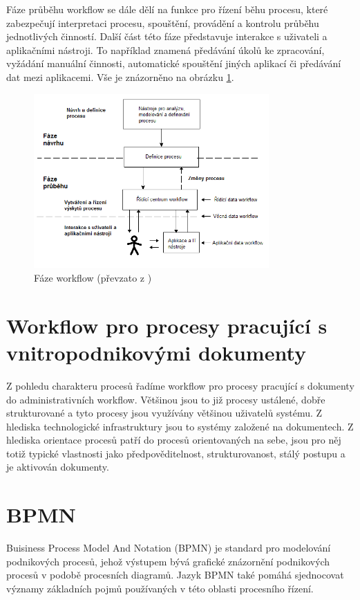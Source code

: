 \documentclass{fithesis}
\begin{document}
Fáze průběhu workflow se dále dělí na funkce pro řízení běhu procesu, které zabezpečují interpretaci procesu, spouštění, provádění a kontrolu průběhu jednotlivých činností. Další část této fáze představuje interakce s uživateli a aplikačními nástroji. To například znamená předávání úkolů ke zpracování, vyžádání manuální činnosti, automatické spouštění jiných aplikací či předávání dat mezi aplikacemi. Vše je znázorněno na obrázku \ref{fig:faze_workflow_obr}.

\begin{figure}[htp]
\centering
\includegraphics[width=340px]{images/faze_workflow.png}
\caption{Fáze workflow (převzato z \cite{wfmc})}
\label{fig:faze_workflow_obr}
\end{figure}

\section{Workflow pro procesy pracující s vnitropodnikovými dokumenty}

Z pohledu charakteru procesů řadíme workflow pro procesy pracující s dokumenty do administrativních workflow. Většinou jsou to již procesy ustálené, dobře strukturované a tyto procesy jsou využívány většinou uživatelů systému. Z hlediska technologické infrastruktury jsou to systémy založené na dokumentech. Z hlediska orientace procesů patří do procesů orientovaných na sebe, jsou pro něj totiž typické vlastnosti jako předpověditelnost, strukturovanost, stálý postupu a je aktivován dokumenty.






\section{BPMN}
Buisiness Process Model And Notation (BPMN) je standard pro modelování podnikových procesů, jehož výstupem bývá grafické znázornění podnikových procesů v podobě procesních diagramů. \cite{bpmn} Jazyk BPMN také pomáhá sjednocovat významy základních pojmů používaných v této oblasti procesního řízení. 
\end{document}
